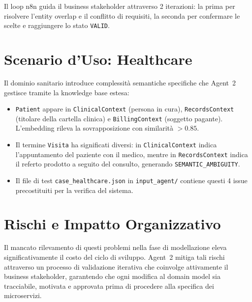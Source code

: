 \documentclass[12pt,a4paper]{report}
\begin{document}
Il loop n8n guida il business stakeholder attraverso 2 iterazioni: la prima per
risolvere l'entity overlap e il conflitto di requisiti, la seconda per confermare
le scelte e raggiungere lo stato \texttt{VALID}.

\section{Scenario d'Uso: Healthcare}

Il dominio sanitario introduce complessità semantiche specifiche che Agent~2
gestisce tramite la knowledge base estesa:

\begin{itemize}
  \item \texttt{Patient} appare in \texttt{ClinicalContext} (persona in cura),
        \texttt{RecordsContext} (titolare della cartella clinica) e
        \texttt{BillingContext} (soggetto pagante).
        L'embedding rileva la sovrapposizione con similarità $>0.85$.
  \item Il termine \texttt{Visita} ha significati diversi: in
        \texttt{ClinicalContext} indica l'appuntamento del paziente con il
        medico, mentre in \texttt{RecordsContext} indica il referto prodotto
        a seguito del consulto, generando \texttt{SEMANTIC\_AMBIGUITY}.
  \item Il file di test \texttt{case\_healthcare.json} in \texttt{input\_agent/}
        contiene questi 4 issue precostituiti per la verifica del sistema.
\end{itemize}
\section{Rischi e Impatto Organizzativo}

Il mancato rilevamento di questi problemi nella fase di modellazione eleva
significativamente il costo del ciclo di sviluppo. Agent~2 mitiga tali rischi
attraverso un processo di validazione iterativa che coinvolge attivamente il business
stakeholder, garantendo che ogni modifica al domain model sia tracciabile, motivata
e approvata prima di procedere alla specifica dei microservizi.
\end{document}
